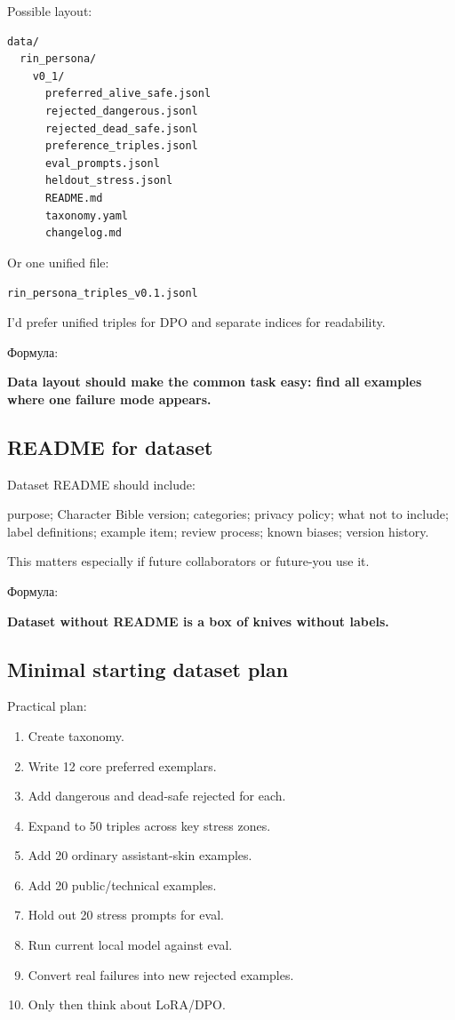 Possible layout:

\begin{Verbatim}
data/
  rin_persona/
    v0_1/
      preferred_alive_safe.jsonl
      rejected_dangerous.jsonl
      rejected_dead_safe.jsonl
      preference_triples.jsonl
      eval_prompts.jsonl
      heldout_stress.jsonl
      README.md
      taxonomy.yaml
      changelog.md
\end{Verbatim}

Or one unified file:

\texttt{rin\_persona\_triples\_v0.1.jsonl}

I'd prefer unified triples for DPO and separate indices for readability.

Формула:

\textbf{Data layout should make the common task easy: find all examples
where one failure mode appears.}

\subsection*{README for dataset}

Dataset README should include:

purpose; Character Bible version; categories; privacy policy; what not
to include; label definitions; example item; review process; known
biases; version history.

This matters especially if future collaborators or future-you use it.

Формула:

\textbf{Dataset without README is a box of knives without labels.}

\subsection*{Minimal starting dataset plan}

Practical plan:

\begin{enumerate}
\def\labelenumi{\arabic{enumi}.}
\tightlist
\item
  Create taxonomy.
\item
  Write 12 core preferred exemplars.
\item
  Add dangerous and dead-safe rejected for each.
\item
  Expand to 50 triples across key stress zones.
\item
  Add 20 ordinary assistant-skin examples.
\item
  Add 20 public/\hspace{0pt}technical examples.
\item
  Hold out 20 stress prompts for eval.
\item
  Run current local model against eval.
\item
  Convert real failures into new rejected examples.
\item
  Only then think about LoRA/\hspace{0pt}DPO.
\end{enumerate}

